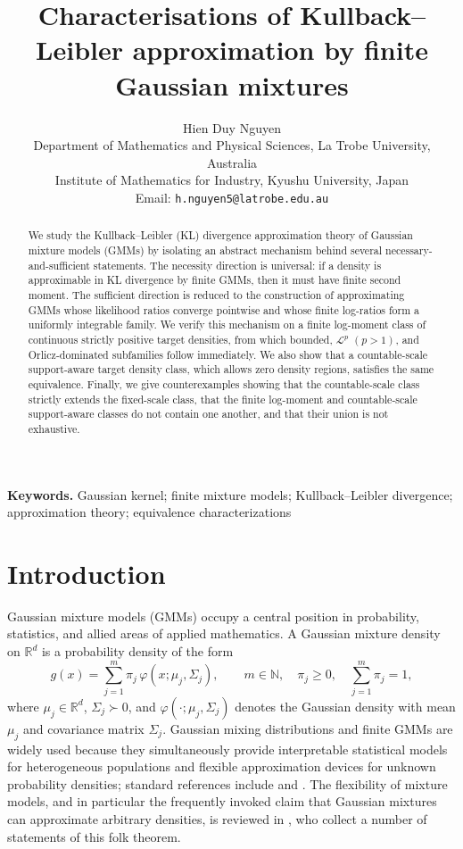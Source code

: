 \documentclass[11pt]{article}
\title{Characterisations of Kullback--Leibler approximation by finite Gaussian mixtures}
\author{Hien Duy Nguyen\\
\small Department of Mathematics and Physical Sciences, La Trobe University, Australia\\
\small Institute of Mathematics for Industry, Kyushu University, Japan\\
\small Email: \texttt{h.nguyen5@latrobe.edu.au}}
\date{}
\theoremstyle{definition}
\begin{document}
\maketitle

\begin{abstract}
We study the Kullback--Leibler (KL) divergence approximation theory of Gaussian mixture models (GMMs) by isolating an abstract mechanism behind several necessary-and-sufficient statements. The necessity direction is universal: if a density is approximable in KL divergence by finite GMMs, then it must have finite second moment. The sufficient direction is reduced to the construction of approximating GMMs whose likelihood ratios converge pointwise and whose finite log-ratios form a uniformly integrable family. We verify this mechanism on a finite log-moment class of continuous strictly positive target densities, from which bounded, $\mathcal L^p$ $(p>1)$, and Orlicz-dominated subfamilies follow immediately. We also show that a countable-scale support-aware target density class, which allows zero density regions, satisfies the same equivalence. Finally, we give counterexamples showing that the countable-scale class strictly extends the fixed-scale class, that the finite log-moment and countable-scale support-aware classes do not contain one another, and that their union is not exhaustive.
\end{abstract}


\medskip
\noindent\textbf{Keywords.} Gaussian kernel; finite mixture models; Kullback--Leibler divergence; approximation theory; equivalence characterizations 

\section{Introduction}\label{sec:intro}

Gaussian mixture models (GMMs) occupy a central position in probability, statistics, and allied areas of applied mathematics. A Gaussian mixture density on $\mathbb{R}^d$ is a probability density of the form
\[
 g(x)=\sum_{j=1}^m \pi_j\,\varphi(x;\mu_j,\Sigma_j),
\qquad m\in\mathbb N,
\quad \pi_j\ge 0,
\quad \sum_{j=1}^m \pi_j=1,
\]
where $\mu_j\in\mathbb{R}^d$, $\Sigma_j\succ0$, and $\varphi(\cdot;\mu_j,\Sigma_j)$ denotes the Gaussian density with mean $\mu_j$ and covariance matrix $\Sigma_j$. Gaussian mixing distributions and finite GMMs are widely used because they simultaneously provide interpretable statistical models for heterogeneous populations and flexible approximation devices for unknown probability densities; standard references include \citet{McLachlanPeel2000} and \citet{Chen2023}. The flexibility of mixture models, and in particular the frequently invoked claim that Gaussian mixtures can approximate arbitrary densities, is reviewed in \citet{NguyenMcLachlan2019}, who collect a number of statements of this folk theorem.
\end{document}
